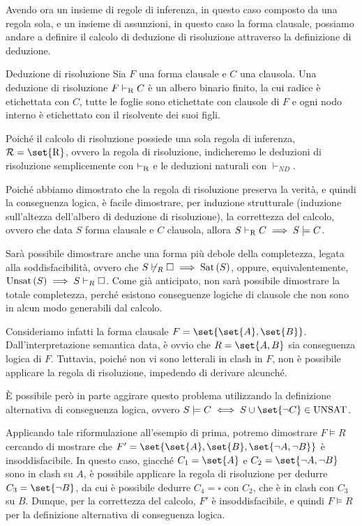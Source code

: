 Avendo ora un insieme di regole di inferenza, in questo caso composto da una regola sola, e un insieme di assunzioni, in questo caso la forma clausale, possiamo andare a definire il calcolo di deduzione di risoluzione attraverso la definizione di deduzione.

\begin{definition}{Deduzione di risoluzione}
  Sia \(F\) una forma clausale e \(C\) una clausola. Una deduzione di risoluzione \(F\vdash_{\operatorname{R} }C\) è un albero binario finito, la cui radice è etichettata con \(C\), tutte le foglie sono etichettate con clausole di \(F\) e ogni nodo interno è etichettato con il risolvente dei suoi figli.
\end{definition}

\begin{note}{}
  Poiché il calcolo di risoluzione possiede una sola regola di inferenza, \(\Rules = \set{\Rule}\), ovvero la regola di risoluzione, indicheremo le deduzioni di risoluzione semplicemente con \(\vdash_{\operatorname{R}}\) e le deduzioni naturali con \(\vdash_{ND}\).
\end{note}

Poiché abbiamo dimostrato che la regola di risoluzione preserva la verità, e quindi la conseguenza logica, è facile dimostrare, per induzione strutturale (induzione sull'altezza dell'albero di deduzione di risoluzione), la correttezza del calcolo, ovvero che data \(S\) forma clausale e \(C\) clausola, allora \(S\vdash_{\operatorname{R}} C \implies S\models C\).

Sarà possibile dimostrare anche una forma più debole della completezza, legata alla soddisfacibilità, ovvero che \(S\not\vdash_R \square \implies \Sat[S]\), oppure, equivalentemente, \(\Unsat[S] \implies S\vdash_R \square\). Come già anticipato, non sarà possibile dimostrare la totale completezza, perché esistono conseguenze logiche di clausole che non sono in alcun modo generabili dal calcolo.

\begin{example}{}
  Consideriamo infatti la forma clausale \(F = \set{\set{A},\set{B}}\). Dall'interpretazione semantica data, è ovvio che \(R=\set{A,B}\) sia conseguenza logica di \(F\). Tuttavia, poiché non vi sono letterali in clash in \(F\), non è possibile applicare la regola di risoluzione, impedendo di derivare alcunché.

  È possibile però in parte aggirare questo problema utilizzando la definizione alternativa di conseguenza logica, ovvero \(S\models C \iff S\cup\set{\neg C} \in \Unsat\).

  Applicando tale riformulazione all'esempio di prima, potremo dimostrare \(F\models R\) cercando di mostrare che \(F' = \set{\set{A}, \set{B}, \set{\neg A, \neg B}}\) è insoddisfacibile. In questo caso, giacché \(C_1 = \set{A}\) e \(C_2 = \set{\neg A, \neg B}\) sono in clash su \(A\), è possibile applicare la regola di risoluzione per dedurre \(C_3 = \set{\neg B}\), da cui è possibile dedurre \(C_4 = \square\) con \(C_2\), che è in clash con \(C_3\) su \(B\). 
  Dunque, per la correttezza del calcolo, \(F'\) è insoddisfacibile, e quindi \(F\models R\) per la definizione alternativa di conseguenza logica.
\end{example}

